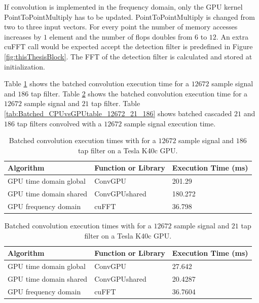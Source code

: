 If convolution is implemented in the frequency domain, only the GPU kernel PointToPointMultiply has to be updated.
PointToPointMultiply is changed from two to three input vectors.
For every point the number of memory accesses increases by $1$ element and the number of flops doubles from $6$ to $12$.
An extra cuFFT call would be expected accept the detection filter is predefined in Figure \ref{fig:thisThesisBlock}.
The FFT of the detection filter is calculated and stored at initialization.

Table \ref{tab:Batched_CPUvsGPUtable_12672_186} shows the batched convolution execution time for a $12672$ sample signal and $186$ tap filter.
Table \ref{tab:Batched_CPUvsGPUtable_12672_21} shows the batched convolution execution time for a $12672$ sample signal and $21$ tap filter.
Table \ref{tab:Batched_CPUvsGPUtable_12672_21_186} shows batched cascaded $21$ and $186$ tap filters convolved with a $12672$ sample signal execution time.
\begin{table}
\caption{Batched convolution execution times with for a $12672$ sample signal and $186$ tap filter on a Tesla K40c GPU.}
\begin{center}
\begin{tabular}{lll}
	\toprule
	Algorithm 				& Function or Library		& Execution Time (ms) \\ \midrule
	GPU time domain global 	& ConvGPU 					& 201.29		\\
	GPU time domain shared 	& ConvGPUshared 			& 180.272		\\
	GPU frequency domain 	& cuFFT						& 36.798 		\\ 
	\bottomrule
\end{tabular}
\end{center}
\label{tab:Batched_CPUvsGPUtable_12672_186}
\end{table}
\begin{table}
\caption{Batched convolution execution times with for a $12672$ sample signal and $21$ tap filter on a Tesla K40c GPU.}
\begin{center}
\begin{tabular}{lll}
	\toprule
	Algorithm 				& Function or Library		& Execution Time (ms) \\ \midrule
	GPU time domain global 	& ConvGPU 					& 27.642		\\
	GPU time domain shared 	& ConvGPUshared 			& 20.4287		\\
	GPU frequency domain 	& cuFFT						& 36.7604		\\ 
	\bottomrule
\end{tabular}
\end{center}
\label{tab:Batched_CPUvsGPUtable_12672_21}
\end{table}
